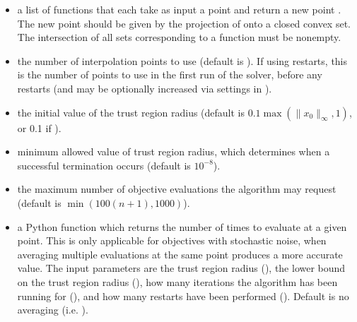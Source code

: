 \documentclass[letterpaper,10pt,english]{sphinxmanual}
\begin{document}
\begin{itemize}
\item {} 
\sphinxAtStartPar
{} \sphinxhyphen{} a list \sphinxcode{\sphinxupquote{{[}f1,f2,...,fn{]}}} of functions that each take as input a point  and return a new point . The new point  should be given by the projection of  onto a closed convex set. The intersection of all sets corresponding to a function must be non\sphinxhyphen{}empty.

\item {} 
\sphinxAtStartPar
{} \sphinxhyphen{} the number of interpolation points to use (default is ). If using restarts, this is the number of points to use in the first run of the solver, before any restarts (and may be optionally increased via settings in ).

\item {} 
\sphinxAtStartPar
{} \sphinxhyphen{} the initial value of the trust region radius (default is \(0.1\max(\|x_0\|_{\infty}, 1)\), or 0.1 if ).

\item {} 
\sphinxAtStartPar
{} \sphinxhyphen{} minimum allowed value of trust region radius, which determines when a successful termination occurs (default is \(10^{-8}\)).

\item {} 
\sphinxAtStartPar
{} \sphinxhyphen{} the maximum number of objective evaluations the algorithm may request (default is \(\min(100(n+1),1000)\)).

\item {} 
\sphinxAtStartPar
{} \sphinxhyphen{} a Python function  which returns the number of times to evaluate  at a given point. This is only applicable for objectives with stochastic noise, when averaging multiple evaluations at the same point produces a more accurate value. The input parameters are the trust region radius (), the lower bound on the trust region radius (), how many iterations the algorithm has been running for (), and how many restarts have been performed (). Default is no averaging (i.e. ).


\end{itemize}
\end{document}
